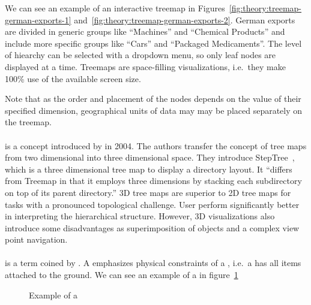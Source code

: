 We can see an example of an interactive treemap in Figures~\ref{fig:theory:treemap-german-exports-1} and~\ref{fig:theory:treemap-german-exports-2}.
German exports are divided in generic groups like ``Machines'' and ``Chemical Products'' and include more specific groups like ``Cars'' and ``Packaged Medicaments''.
The level of hiearchy can be selected with a dropdown menu, so only leaf nodes are displayed at a time.
Treemaps are space-filling visualizations, i.e.\ they make 100\% use of the available screen size.

Note that as the order and placement of the nodes depends on the value of their specified dimension, geographical units of data may may be placed separately on the treemap.

\paragraph{\threedTmaps{}} is a concept introduced by \textcite{Bladh2004} in 2004.
The authors transfer the concept of tree maps from two dimensional into three dimensional space.
They introduce StepTree~\cite{Bladh2004}, which is a three dimensional tree map to display a directory layout.
It ``differs from Treemap in that it employs three dimensions by stacking each subdirectory on top of its parent directory.''
3D tree maps are superior to 2D tree maps for tasks with a pronounced topological challenge.
User perform significantly better in interpreting the hierarchical structure.
However, 3D visualizations also introduce some disadvantages as superimposition of objects and a complex view point navigation.

\paragraph{\tmap{}} is a term coined by \textcite{Limberger2016}.
A \tmap{} emphasizes physical constraints of a \threedTmap{}, i.e.\ a \tmap{} has all items attached to the ground.
We can see an example of a \tmap{} in figure~\ref{fig:research:ua_treemap}

\begin{figure}[h]
  \centering
  \caption{Example of a \tmap{}}\label{fig:research:ua_treemap}
\end{figure}


